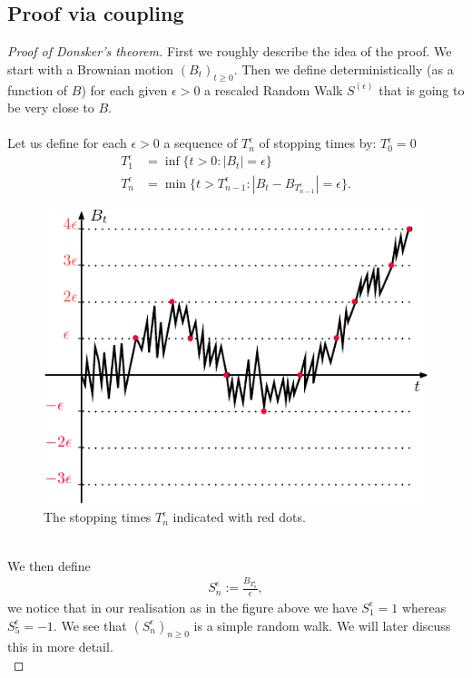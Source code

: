\documentclass[../mainfile.tex]{subfiles}
\begin{document}
\subsection{Proof via coupling}
\begin{proof}[Proof of Donsker's theorem] First we roughly describe the idea of the proof. We start with a Brownian motion $(B_t)_{t \geq 0}$. Then we define deterministically (as a function of $B$) for each given $\epsilon >0$ a rescaled Random Walk $S^{(\epsilon)}$ that is going to be very close to $B$.\\
\\
Let us define for each $\epsilon >0$ a sequence of $T_n^\epsilon$ of stopping times by: $T_0^\epsilon =0$ 
\begin{align*}
T_1^\epsilon &= \inf \{ t >0 : |B_t| = \epsilon \} \\
T_n^\epsilon& = \min \{ t> T_{n-1}^\epsilon : |B_t-B_{T_{n-1}^\epsilon}| = \epsilon \}. 
\end{align*}
\begin{figure}[hbtp]
\centering
\includegraphics[scale=1]{donsker1.pdf}
\caption{The stopping times $T_n^\epsilon$ indicated with red dots. }
\end{figure}
\\
We then define 
\begin{align*}
S_n^\epsilon := \frac{B_{T_n^\epsilon}}{\epsilon},
\end{align*}
we notice that in our realisation as in the figure above we have $S_1^\epsilon
=1$ whereas $S_5^\epsilon = -1$. We see that $(S_n^\epsilon)_{n \geq 0}$ is a simple random walk. We will later discuss this in more detail. \\

\end{proof}
\end{document}
